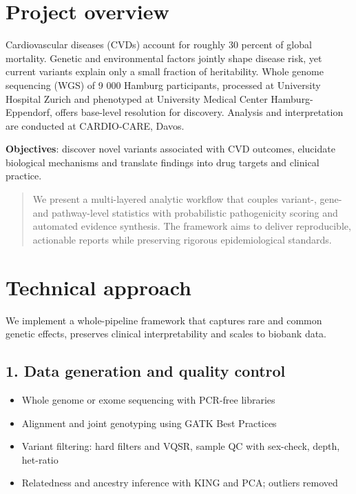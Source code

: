 
\section{Project overview}

Cardiovascular diseases (CVDs) account for roughly 30 percent of global mortality. Genetic and environmental factors jointly shape disease risk, yet current variants explain only a small fraction of heritability. Whole genome sequencing (WGS) of 9 000 Hamburg participants, processed at University Hospital Zurich and phenotyped at University Medical Center Hamburg-Eppendorf, offers base-level resolution for discovery. Analysis and interpretation are conducted at CARDIO-CARE, Davos.

\textbf{Objectives}: discover novel variants associated with CVD outcomes, elucidate biological mechanisms and translate findings into drug targets and clinical practice.

\begin{abstract}
We present a multi-layered analytic workflow that couples variant-, gene- and pathway-level statistics with probabilistic pathogenicity scoring and automated evidence synthesis. The framework aims to deliver reproducible, actionable reports while preserving rigorous epidemiological standards.
\end{abstract}


\section{Technical approach}

We implement a whole-pipeline framework that captures rare and common genetic effects, preserves clinical interpretability and scales to biobank data.

\subsection*{1. Data generation and quality control}
\begin{itemize}
  \item Whole genome or exome sequencing with PCR-free libraries  
  \item Alignment and joint genotyping using GATK Best Practices \cite{VanDerAuwera2013}  
  \item Variant filtering: hard filters and VQSR, sample QC with sex-check, depth, het-ratio
  \item Relatedness and ancestry inference with KING and PCA; outliers removed
\end{itemize}


